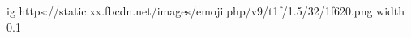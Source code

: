  
 
 
 
 
\ifcmt
  ig https://static.xx.fbcdn.net/images/emoji.php/v9/t1f/1.5/32/1f620.png
  width 0.1
\fi
